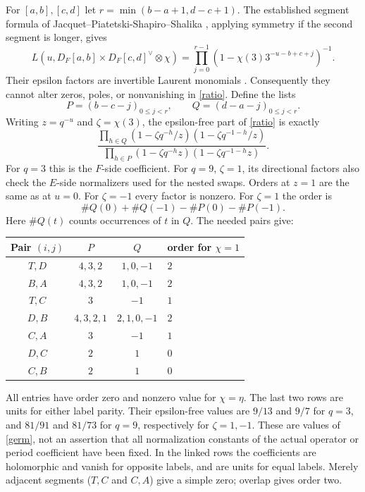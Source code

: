 \documentclass[11pt]{article}
\begin{document}
For $[a,b],[c,d]$ let $r=\min(b-a+1,d-c+1)$. The established segment formula of Jacquet--Piatetski-Shapiro--Shalika \cite[Theorem 8.2, (5), pp.444--445]{JPSS}, applying symmetry if the second segment is longer, gives
\begin{equation}\label{Lfactor}
L(u,D_F[a,b]\times D_F[c,d]^\vee\otimes\chi)
=\prod_{j=0}^{r-1}(1-\chi(3)3^{-u-b+c+j})^{-1}.
\end{equation}
Their epsilon factors are invertible Laurent monomials \cite[\S2.9, p.396]{JPSS}. Consequently they cannot alter zeros, poles, or nonvanishing in \eqref{ratio}. Define the lists
\[
P=(b-c-j)_{0\le j<r},\qquad Q=(d-a-j)_{0\le j<r}.
\]
Writing $z=q^{-u}$ and $\zeta=\chi(3)$, the epsilon-free part of \eqref{ratio} is exactly
\begin{equation}\label{germ}
\frac{\displaystyle\prod_{h\in Q}(1-\zeta q^{-h}/z)(1-\zeta q^{-1-h}/z)}
{\displaystyle\prod_{h\in P}(1-\zeta q^{-h}z)(1-\zeta q^{-1-h}z)}.
\end{equation}
For $q=3$ this is the $F$-side coefficient. For $q=9$, $\zeta=1$, its directional factors also check the $E$-side normalizers used for the nested swaps. Orders at $z=1$ are the same as at $u=0$. For $\zeta=-1$ every factor is nonzero. For $\zeta=1$ the order is
\[
\#Q(0)+\#Q(-1)-\#P(0)-\#P(-1).
\]
Here $\#Q(t)$ counts occurrences of $t$ in $Q$. The needed pairs give:
\begin{center}
\begin{tabular}{cccl}
\toprule
Pair $(i,j)$ & $P$ & $Q$ & order for $\chi=1$\\
\midrule
$T,D$ & $4,3,2$ & $1,0,-1$ & $2$\\
$B,A$ & $4,3,2$ & $1,0,-1$ & $2$\\
$T,C$ & $3$ & $-1$ & $1$\\
$D,B$ & $4,3,2,1$ & $2,1,0,-1$ & $2$\\
$C,A$ & $3$ & $-1$ & $1$\\
$D,C$ & $2$ & $1$ & $0$\\
$C,B$ & $2$ & $1$ & $0$\\
\bottomrule
\end{tabular}
\end{center}
All entries have order zero and nonzero value for $\chi=\eta$. The last two rows are units for either label parity. Their epsilon-free values are $9/13$ and $9/7$ for $q=3$, and $81/91$ and $81/73$ for $q=9$, respectively for $\zeta=1,-1$. These are values of \eqref{germ}, not an assertion that all normalization constants of the actual operator or period coefficient have been fixed. In the linked rows the coefficients are holomorphic and vanish for opposite labels, and are units for equal labels. Merely adjacent segments ($T,C$ and $C,A$) give a simple zero; overlap gives order two.
\end{document}
